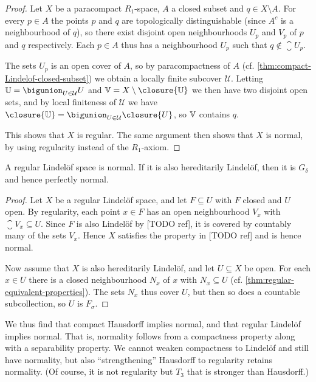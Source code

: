\documentclass[article, a4paper, 11pt, oneside]{memoir}
\numberwithin{equation}{chapter}
\newcommand{\calU}{\mathcal{U}}
\begin{document}
\begin{proof}
    Let $X$ be a paracompact $R_1$-space, $A$ a closed subset and $q \in X \setminus A$. For every $p \in A$ the points $p$ and $q$ are topologically distinguishable (since $A^c$ is a neighbourhood of $q$), so there exist disjoint open neighbourhoods $U_p$ and $V_p$ of $p$ and $q$ respectively. Each $p \in A$ thus has a neighbourhood $U_p$ such that $q \not\in \closure{U}_p$.
    
    The sets $U_p$ is an open cover of $A$, so by paracompactness of $A$ (cf. \cref{thm:compact-Lindelof-closed-subset}) we obtain a locally finite subcover $\calU$. Letting $\bbU = \bigunion_{U \in \calU} U$ and $\bbV = X \setminus \closure{\bbU}$ we then have two disjoint open sets, and by local finiteness of $\calU$ we have $\closure{\bbU} = \bigunion_{U \in \calU} \closure{U}$, so $\mathbb{V}$ contains $q$.

    This shows that $X$ is regular. The same argument then shows that $X$ is normal, by using regularity instead of the $R_1$-axiom.
\end{proof}


\begin{proposition}
    A regular Lindelöf space is normal. If it is also hereditarily Lindelöf, then it is $G_\delta$ and hence perfectly normal.
\end{proposition}

\begin{proof}
    Let $X$ be a regular Lindelöf space, and let $F \subseteq U$ with $F$ closed and $U$ open. By regularity, each point $x \in F$ has an open neighbourhood $V_x$ with $\closure{V}_x \subseteq U$. Since $F$ is also Lindelöf by [TODO ref], it is covered by countably many of the sets $V_x$. Hence $X$ satisfies the property in [TODO ref] and is hence normal.

    Now assume that $X$ is also hereditarily Lindelöf, and let $U \subseteq X$ be open. For each $x \in U$ there is a closed neighbourhood $N_x$ of $x$ with $N_x \subseteq U$ (cf. \cref{thm:regular-equivalent-properties}). The sets $N_x$ thus cover $U$, but then so does a countable subcollection, so $U$ is $F_\sigma$.
\end{proof}

We thus find that compact Hausdorff implies normal, and that regular Lindelöf implies normal. That is, normality follows from a compactness property along with a separability property. We cannot weaken compactness to Lindelöf and still have normality, but also \enquote{strengthening} Hausdorff to regularity retains normality. (Of course, it is not regularity but $T_3$ that is stronger than Hausdorff.)
\end{document}
